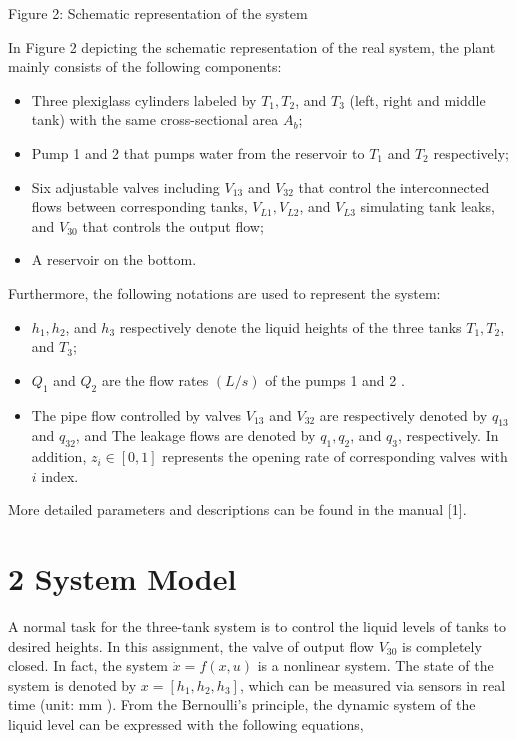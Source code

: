 \documentclass[10pt]{article}
\begin{document}
Figure 2: Schematic representation of the system

In Figure 2 depicting the schematic representation of the real system, the plant mainly consists of the following components:

\begin{itemize}
  \item Three plexiglass cylinders labeled by $T_{1}, T_{2}$, and $T_{3}$ (left, right and middle tank) with the same cross-sectional area $A_{b}$;
  \item Pump 1 and 2 that pumps water from the reservoir to $T_{1}$ and $T_{2}$ respectively;
  \item Six adjustable valves including $V_{13}$ and $V_{32}$ that control the interconnected flows between corresponding tanks, $V_{L 1}, V_{L 2}$, and $V_{L 3}$ simulating tank leaks, and $V_{30}$ that controls the output flow;
  \item A reservoir on the bottom.
\end{itemize}

Furthermore, the following notations are used to represent the system:

\begin{itemize}
  \item $h_{1}, h_{2}$, and $h_{3}$ respectively denote the liquid heights of the three tanks $T_{1}, T_{2}$, and $T_{3}$;
  \item $Q_{1}$ and $Q_{2}$ are the flow rates $(L / s)$ of the pumps 1 and 2 .
  \item The pipe flow controlled by valves $V_{13}$ and $V_{32}$ are respectively denoted by $q_{13}$ and $q_{32}$, and The leakage flows are denoted by $q_{1}, q_{2}$, and $q_{3}$, respectively. In addition, $z_{i} \in[0,1]$ represents the opening rate of corresponding valves with $i$ index.
\end{itemize}

More detailed parameters and descriptions can be found in the manual [1].

\section*{2 System Model}
A normal task for the three-tank system is to control the liquid levels of tanks to desired heights. In this assignment, the valve of output flow $V_{30}$ is completely closed. In fact, the system $\dot{x}=f(x, u)$ is a nonlinear system. The state of the system is denoted by $x=\left[h_{1}, h_{2}, h_{3}\right]$, which can be measured via sensors in real time (unit: $\mathrm{mm}$ ). From the Bernoulli's principle, the dynamic system of the liquid level can be expressed with the following equations,
\end{document}
